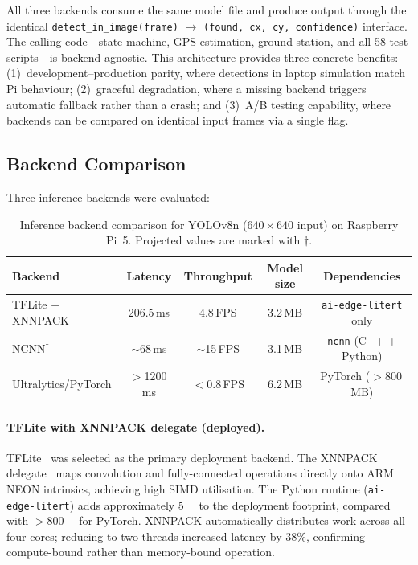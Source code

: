 \documentclass[10pt,a4paper]{article}
\begin{document}
All three backends consume the same model file and produce output through the identical \texttt{detect\_in\_image(frame)} $\to$ \texttt{(found, cx, cy, confidence)} interface. The calling code---state machine, GPS estimation, ground station, and all 58 test scripts---is backend-agnostic. This architecture provides three concrete benefits: (1)~development--production parity, where detections in laptop simulation match Pi behaviour; (2)~graceful degradation, where a missing backend triggers automatic fallback rather than a crash; and (3)~A/B testing capability, where backends can be compared on identical input frames via a single flag.

\subsection{Backend Comparison}

Three inference backends were evaluated:

\begin{table}[ht]
  \centering
  \caption{Inference backend comparison for YOLOv8n ($640 \times 640$ input) on Raspberry Pi~5. Projected values are marked with $\dagger$.}\label{tab:backend-comparison}
  \begin{tabular}{@{}l c c c c@{}}
    \toprule
    \textbf{Backend} & \textbf{Latency} & \textbf{Throughput} & \textbf{Model size} & \textbf{Dependencies} \\
    \midrule
    TFLite + XNNPACK    & 206.5\,ms & 4.8\,FPS  & 3.2\,MB  & \texttt{ai-edge-litert} only \\
    NCNN$^\dagger$      & ${\sim}$68\,ms  & ${\sim}$15\,FPS & 3.1\,MB  & \texttt{ncnn} (C++ + Python) \\
    Ultralytics/PyTorch & $>$1200\,ms & $<$0.8\,FPS & 6.2\,MB  & PyTorch ($>$800\,MB) \\
    \bottomrule
  \end{tabular}
\end{table}

\paragraph{TFLite with XNNPACK delegate (deployed).}
TFLite~\cite{tflite} was selected as the primary deployment backend. The XNNPACK delegate~\cite{xnnpack} maps convolution and fully-connected operations directly onto ARM NEON intrinsics, achieving high SIMD utilisation. The Python runtime (\texttt{ai-edge-litert}) adds approximately \SI{5}{\mega\byte} to the deployment footprint, compared with $>$\SI{800}{\mega\byte} for PyTorch. XNNPACK automatically distributes work across all four cores; reducing to two threads increased latency by 38\%, confirming compute-bound rather than memory-bound operation.
\end{document}
